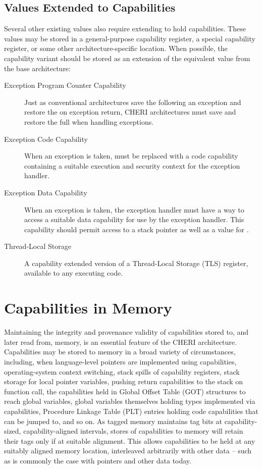 \subsection{Values Extended to Capabilities}

Several other existing values also require extending to hold
capabilities.  These values may be stored in a general-purpose
capability register, a special capability register, or some other
architecture-specific location.  When possible, the capability variant
should be stored as an extension of the equivalent value from the base
architecture:

\begin{description}
\item[Exception Program Counter Capability] Just as conventional
  architectures save the \PC{} following an exception and restore the
  \PC{} on exception return, CHERI architectures must save and restore
  the full \PCC{} when handling exceptions.

\item[Exception Code Capability] When an exception is taken, \PCC{} must
  be replaced with a code capability containing a suitable
  execution and security context for the exception handler.

\item[Exception Data Capability] When an exception is taken, the
  exception handler must have a way to access a suitable data
  capability for use by the exception handler.  This capability should
  permit access to a stack pointer as well as a value for \DDC{}.

\item[Thread-Local Storage] A capability extended
  version of a Thread-Local Storage (TLS) register, available to any executing
  code.
\end{description}

\section{Capabilities in Memory}

Maintaining the integrity and provenance validity of capabilities stored to,
and later read from, memory, is an essential feature of the CHERI
architecture.
Capabilities may be stored to memory in a broad variety of circumstances,
including, when language-level pointers are implemented using capabilities,
operating-system context switching, stack spills of capability registers,
stack storage for local pointer variables, pushing return capabilities to the
stack on function call, the capabilities held in Global Offset Table (GOT)
structures to reach global variables, global variables themselves holding
types implemented via capabilities, Procedure Linkage Table (PLT) entries
holding code capabilities that can be jumped to, and so on.
As tagged memory maintains tag bits at capability-sized, capability-aligned
intervals, stores of capabilities to memory will retain their tags only if
at suitable alignment.
This allows capabilities to be held at any suitably aligned memory location,
interleaved arbitrarily with other data -- such as is commonly the case with
pointers and other data today.

